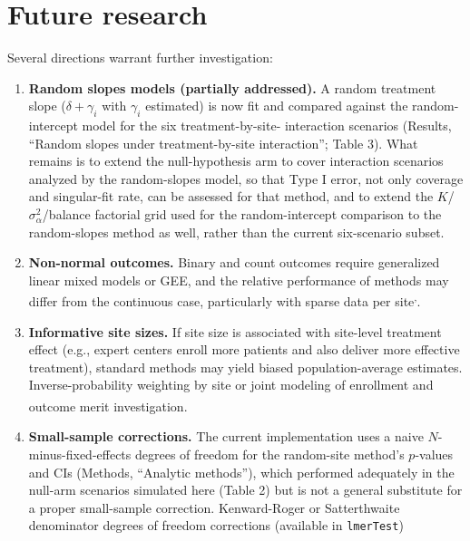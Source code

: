 \documentclass[
  11pt,
]{article}
\begin{document}
\section{Future research}\label{future-research}

Several directions warrant further investigation:

\begin{enumerate}
\def\labelenumi{\arabic{enumi}.}
\item
  \textbf{Random slopes models (partially addressed).} A random
  treatment slope (\(\delta + \gamma_i\) with \(\gamma_i\)
  estimated) is now fit and compared against the
  random-intercept model for the six treatment-by-site-
  interaction scenarios (Results, ``Random slopes under
  treatment-by-site interaction''; Table 3). What remains is
  to extend the null-hypothesis arm to cover interaction
  scenarios analyzed by the random-slopes model, so that
  Type I error, not only coverage and singular-fit rate, can
  be assessed for that method, and to extend the
  \(K\)/\(\sigma^2_{\alpha}\)/balance factorial grid used for the
  random-intercept comparison to the random-slopes method as
  well, rather than the current six-scenario subset.
\item
  \textbf{Non-normal outcomes.} Binary and count outcomes
  require generalized linear mixed models or GEE, and
  the relative performance of methods may differ from
  the continuous case, particularly with sparse data per
  site\textsuperscript{,}.
\item
  \textbf{Informative site sizes.} If site size is associated
  with site-level treatment effect (e.g., expert centers
  enroll more patients and also deliver more effective
  treatment), standard methods may yield biased
  population-average estimates. Inverse-probability
  weighting by site or joint modeling of enrollment and
  outcome merit investigation\textsuperscript{}.
\item
  \textbf{Small-sample corrections.} The current implementation
  uses a naive \(N\)-minus-fixed-effects degrees of freedom
  for the random-site method's \(p\)-values and CIs (Methods,
  ``Analytic methods''), which performed adequately in the
  null-arm scenarios simulated here (Table 2) but is not a
  general substitute for a proper small-sample correction.
  Kenward-Roger or Satterthwaite denominator degrees of
  freedom corrections (available in \texttt{lmerTest})

\end{enumerate}
\end{document}
